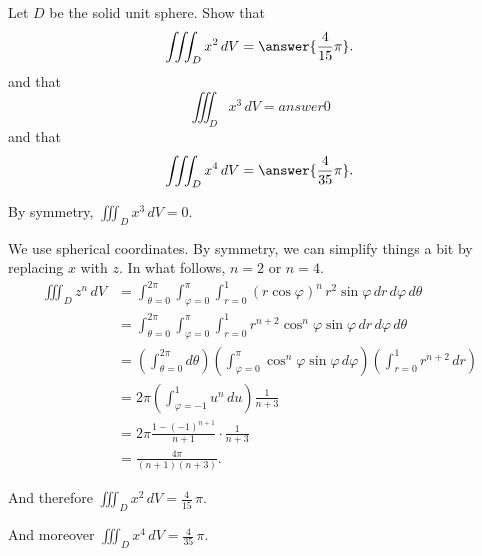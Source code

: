 \documentclass{ximera}
\author{Jim Fowler}
\begin{document}
\begin{exercise}
  
  Let $D$ be the solid unit sphere.  Show that
  \[
    \iiint_D x^2 \, dV = \answer{\frac{4}{15} \pi}.
  \]
  and that
  \[
    \iiint_D x^3 \, dV = answer{0}
  \]
  and that
  \[
    \iiint_D x^4 \, dV = \answer{\frac{4}{35} \pi}.
  \]

  \begin{hint}
By symmetry, $\iiint_D x^3 \, dV = 0$.
\end{hint}

\begin{hint}
We use spherical coordinates.  By symmetry, we can simplify things a bit by replacing $x$ with $z$.  In what follows, $n = 2$ or $n = 4$.
 \begin{align*}
   \iiint_D z^n \, dV
 &= \int_{\theta=0}^{2\pi} \int_{\varphi=0}^{\pi} \int_{r = 0}^1 (r \cos \varphi)^n \, r^2 \sin \varphi \, dr \, d\varphi \, d\theta \\
 &= \int_{\theta=0}^{2\pi} \int_{\varphi=0}^{\pi} \int_{r = 0}^1 r^{n + 2} \cos^n \varphi \sin \varphi \, dr \, d\varphi \, d\theta \\
 &= \left( \int_{\theta=0}^{2\pi} d\theta \right) \left(\int_{\varphi=0}^{\pi} \cos^n \varphi \sin \varphi \, d\varphi \right) \left( \int_{r = 0}^1 r^{n+2} \, dr \right) \\
 &= 2 \pi \left(\int_{\varphi=-1}^{1} u^n \, du \right) \frac{1}{n+3} \\
 &= 2 \pi \frac{1 - (-1)^{n+1}}{n+1} \cdot \frac{1}{n+3} \\
 &= \frac{4 \pi}{(n+1)(n+3)}.
 \end{align*}
\end{hint}

\begin{hint}
And therefore $\iiint_D x^2 \, dV = \frac{4}{15} \, \pi$.
\end{hint}
\begin{hint}
  And moreover $\iiint_D x^4 \, dV = \frac{4}{35} \, \pi$.
\end{hint}

\end{exercise}
\end{document}
